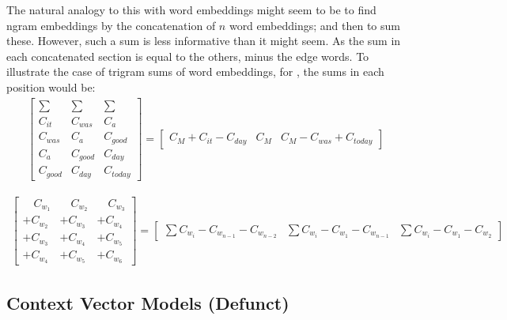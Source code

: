 \documentclass[12pt,parskip]{komatufte}
\begin{document}
The natural analogy to this with word embeddings might seem to be to find ngram embeddings by the concatenation of $n$ word embeddings; and then to sum these.
However, such a sum is less informative than it might seem.
As the sum in each concatenated section is equal to the others, minus the edge words. To illustrate the case of trigram sums of word embeddings, for ,
the sums in each position would be:
\begin{align}
\left[\begin{array}{c|c|c}
	\sum & \sum & \sum\\
	C_{it} & C_{was} & C_{a}\\
	C_{was} & C_{a} & C_{good}\\
	C_{a} & C_{good} & C_{day}\\
	C_{good} & C_{day} & C_{today}
\end{array}\right]=\left[\begin{array}{c|c|c}
	C_{M}+C_{it}-C_{day} & C_{M} & C_{M}-C_{was}+C_{today}\end{array}\right]
\end{align}

\begin{align}
\left[\begin{array}{c|c|c}
	\quad C_{w_{1}} & \quad C_{w_{2}} & \quad C_{w_{3}}\\
	+C_{w_{2}} & +C_{w_{3}} & +C_{w_{4}}\\
	+C_{w_{3}} & +C_{w_{4}} & +C_{w_{5}}\\
	+C_{w_{4}} & +C_{w_{5}} & +C_{w_{6}}
\end{array}\right]=\left[\begin{array}{c|c|c}
	\sum C_{w_{i}}-C_{w_{n-1}}-C_{w_{n-2}} & \sum C_{w_{i}}-C_{w_{1}}-C_{w_{n-1}} & \sum C_{w_{i}}-C_{w_{1}}-C_{w_{2}}\end{array}\right]
\end{align}

\subsection{Context Vector Models (Defunct)}

\end{document}
